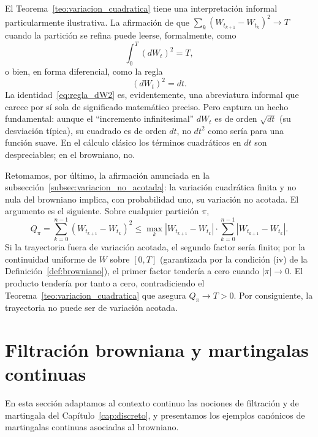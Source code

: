\documentclass[11pt,a4paper,oneside]{report}
\theoremstyle{plain}
\theoremstyle{definition}
\theoremstyle{remark}
\newcommand{\1}{\mathbf{1}}
\begin{document}
El Teorema~\ref{teo:variacion_cuadratica}
tiene una interpretación informal particularmente ilustrativa. La afirmación de que
$\sum_k (W_{t_{k+1}} - W_{t_k})^2 \to T$ cuando la partición se refina
puede leerse, formalmente, como
\begin{equation*}
  \int_0^T (dW_t)^2 = T,
\end{equation*}
o bien, en forma diferencial, como la regla
\begin{equation}\label{eq:regla_dW2}
  (dW_t)^2 = dt.
\end{equation}
La identidad~\eqref{eq:regla_dW2} es, evidentemente, una abreviatura informal que carece por sí sola de significado matemático preciso.
Pero captura un hecho fundamental: aunque el ``incremento
infinitesimal'' $dW_t$ es de orden $\sqrt{dt}$ (su desviación
típica), su cuadrado es de orden $dt$, no $dt^2$ como sería para
una función suave. En el cálculo clásico los términos cuadráticos
en $dt$ son despreciables; en el browniano, no.

Retomamos, por último, la afirmación anunciada en la
subsección~\ref{subsec:variacion_no_acotada}: la variación cuadrática
finita y no nula del browniano implica, con probabilidad uno, su
variación no acotada. El argumento es el siguiente. Sobre cualquier
partición $\pi$,
\begin{equation*}
  Q_\pi = \sum_{k=0}^{n-1} (W_{t_{k+1}} - W_{t_k})^2
        \leq \max_k |W_{t_{k+1}} - W_{t_k}|
              \cdot \sum_{k=0}^{n-1} |W_{t_{k+1}} - W_{t_k}|.
\end{equation*}
Si la trayectoria fuera de variación acotada, el segundo factor sería
finito; por la continuidad uniforme de $W$ sobre $[0, T]$ (garantizada
por la condición (iv) de la Definición~\ref{def:browniano}), el primer
factor tendería a cero cuando $|\pi| \to 0$. El producto tendería por
tanto a cero, contradiciendo el Teorema~\ref{teo:variacion_cuadratica}
que asegura $Q_\pi \to T > 0$. Por consiguiente, la trayectoria no
puede ser de variación acotada.

\section{Filtración browniana y martingalas continuas}
\label{sec:filtracion_browniana}

En esta sección adaptamos al contexto continuo las nociones de filtración
y de martingala del Capítulo~\ref{cap:discreto}, y presentamos los ejemplos
canónicos de martingalas continuas asociadas al browniano.
\end{document}
